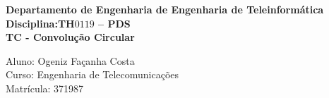 \documentclass[a4paper,12pt]{article}
\begin{document}
{
%
     {\sf
       \vspace*{4cm}
      \begin{center}
         {\Large {\bfseries Departamento de Engenharia de Engenharia de Teleinformática}}\\
         \vspace*{1.0cm}
         {\Large{\bfseries Disciplina:TH$0119$ -- PDS}}\\
         \vspace*{1.0cm}
         {\large{\bfseries TC - Convolução Circular}}
     \end{center}
 \vspace*{12.0cm}
    {\Large
        \begin{flushleft}
	       \noindent Aluno: Ogeniz Façanha Costa\\
	       Curso: Engenharia de Telecomunicações\\
	       Matrícula: 371987\\
        \end{flushleft}}
    }
%
\newpage
%

}
%
%
%
%
\end{document}
